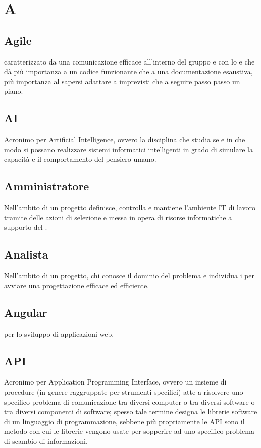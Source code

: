 \chapter{A}

\section{Agile}
 caratterizzato da una comunicazione efficace all'interno del gruppo e con lo  e che dà più importanza a un codice funzionante che a una documentazione esaustiva, più importanza al sapersi adattare a imprevisti che a seguire passo passo un piano.

\section{AI} \label{sec:Artificial Intelligence}
Acronimo per Artificial Intelligence, ovvero la disciplina che studia se e in che modo si possano realizzare sistemi informatici intelligenti in grado di simulare la capacità e il comportamento del pensiero umano.

\section{Amministratore} \label{sec:Amministratori}
Nell'ambito di un progetto definisce, controlla e mantiene l'ambiente IT di lavoro tramite delle azioni di selezione e messa in opera di risorse informatiche a supporto del . 

\section{Analista}\label{sec:Analisti}
Nell'ambito di un progetto, chi conosce il dominio del problema e individua i  per avviare una progettazione efficace ed efficiente.

\section{Angular}
  per lo sviluppo di applicazioni web.

\section{API}\label{sec:Application Programming Interface}
Acronimo per Application Programming Interface, ovvero un insieme di procedure (in genere raggruppate per strumenti specifici) atte a risolvere uno specifico problema di comunicazione tra diversi computer o tra diversi software o tra diversi componenti di software; spesso tale termine designa le librerie software di un linguaggio di programmazione, sebbene più propriamente le API sono il metodo con cui le librerie vengono usate per sopperire ad uno specifico problema di scambio di informazioni.

